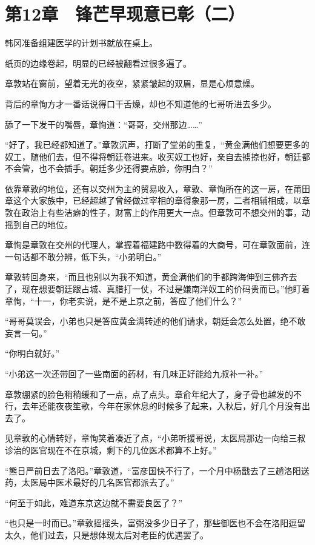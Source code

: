 \section{第12章　锋芒早现意已彰（二）}

韩冈准备组建医学的计划书就放在桌上。

纸页的边缘卷起，明显的已经被翻看过很多遍了。

章敦站在窗前，望着无光的夜空，紧紧皱起的双眉，显是心烦意燥。

背后的章恂方才一番话说得口干舌燥，却也不知道他的七哥听进去多少。

舔了一下发干的嘴唇，章恂道：“哥哥，交州那边……”

“好了，我已经都知道了。”章敦沉声，打断了堂弟的重复，“黄金满他们想要更多的奴工，随他们去，但不得将朝廷卷进来。收买奴工也好，亲自去掳掠也好，朝廷都不会管，也不会插手。朝廷多少还得要点脸，你明白？”

依靠章敦的地位，还有以交州为主的贸易收入，章敦、章恂所在的这一房，在莆田章这个大家族中，已经超越了曾经做过宰相的章得象那一房，二者相辅相成，以章敦在政治上有些洁癖的性子，财富上的作用更大一点。但章敦可不想交州的事，动摇到自己的地位。

章恂是章敦在交州的代理人，掌握着福建路中数得着的大商号，可在章敦面前，连一句话都不敢分辨，低下头，“小弟明白。”

章敦转回身来，“而且也别以为我不知道，黄金满他们的手都跨海伸到三佛齐去了，现在想要朝廷跟占城、真腊打一仗，不过是嫌南洋奴工的价码贵而已。”他盯着章恂，“十一，你老实说，是不是上京之前，答应了他们什么？”

“哥哥莫误会，小弟也只是答应黄金满转述的他们请求，朝廷会怎么处置，绝不敢妄言一句。”

“你明白就好。”

“小弟这一次还带回了一些南面的药材，有几味正好能给九叔补一补。”

章敦绷紧的脸色稍稍缓和了一点，点了点头。章俞年纪大了，身子骨也越发的不行，去年还能夜夜笙歌，今年在家休息的时候多了起来，入秋后，好几个月没有出去了。

见章敦的心情转好，章恂笑着凑近了点，“小弟听援哥说，太医局那边一向给三叔诊治的医官现在不在京城，剩下的几位医术都算不上好。”

“熊日严前日去了洛阳。”章敦道，“富彦国快不行了，一个月中杨戬去了三趟洛阳送药，太医局中医术最好的几名医官都派去了。”

“何至于如此，难道东京这边就不需要良医了？”

“也只是一时而已。”章敦摇摇头，富弼没多少日子了，那些御医也不会在洛阳逗留太久，他们过去，只是想体现太后对老臣的优遇罢了。

